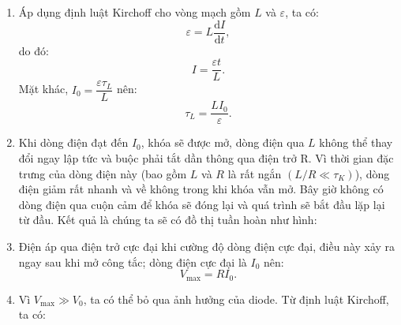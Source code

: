 \begin{loigiai}\[\]
    \begin{enumerate}[1)]
        \item Áp dụng định luật Kirchoff cho vòng mạch gồm $L$ và $\varepsilon$, ta có:
        \[\varepsilon=L \dfrac{\mathrm{d}I}{\mathrm{d}t},\]
        do đó:
        \[I=\dfrac{\varepsilon t}{L}.\]
        Mặt khác, $I_0=\dfrac{\varepsilon \tau_L}{L}$ nên:
        \[\tau_L=\dfrac{LI_0}{\varepsilon}.\]
        \item Khi dòng điện đạt đến $I_0$, khóa sẽ được mở, dòng điện qua $L$ không thể thay đổi ngay lập tức và buộc phải tắt dần thông qua điện trở R. Vì thời gian đặc trưng của dòng điện này (bao gồm $L$ và $R$ là rất ngắn $(L/R \ll \tau_K)$), dòng điện giảm rất nhanh và về không trong khi khóa vẫn mở. Bây giờ không có dòng điện qua cuộn cảm để khóa sẽ đóng lại và quá trình sẽ bắt đầu lặp lại từ đầu. Kết quả là chúng ta sẽ có đồ thị tuần hoàn như hình:
        \begin{center}
        \end{center}
        \item Điện áp qua điện trở cực đại khi cường độ dòng điện cực đại, điều này xảy ra ngay sau khi mở công tắc; dòng điện cực đại là $I_0$ nên:
        \[V_\mathrm{max} = RI_0.\]
        \item Vì $V_\mathrm{max} \gg V_0$, ta có thể bỏ qua ảnh hưởng của diode. Từ định luật Kirchoff, ta có:

\end{enumerate}
\end{loigiai}
